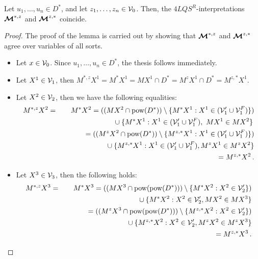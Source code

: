\documentclass{fundam}
\newcommand{\model}{\ensuremath{\mbox{\boldmath $\mathcal{M}$}}\xspace}
\newcommand{\pow}{\mbox{\rm pow}}
\newcommand{\QLQSR}{\ensuremath{\mbox{$4\mathit{LQS}^{R}$}}\xspace}
\begin{document}
\begin{lemma}
\label{le_M*zMz*} Let $u_{1},\ldots,u_{n} \in D^{*}$, and let
$z_{1},\ldots,z_{n} \in {\cal V}_{0}$. Then, the $\QLQSR$-interpretations $\model^{*,z}$
and $\model^{z,*}$ coincide.

\end{lemma}
\begin{proof}
The proof of the lemma is carried out by showing that $\model^{*,z}$ and $\model^{z,*}$ agree over variables of all sorts.
\begin{itemize}
\item Let $x \in {\cal V}_{0}$. Since $u_{1},\ldots,u_{n} \in D^{*}$, the thesis  follows immediately.

\item Let $X^1 \in {\cal V}_{1}$, then $M^{*,z}X^1 = M^{*}X^1 =
MX^1 \cap D^{*} = M^{z}X^1 \cap D^{*} = M^{z,*}X^1$.

\item Let $X^2 \in {\cal V}_{2}$, then we have the following equalities:
\begin{eqnarray*}
        M^{*,z}X^2 & = & M^{*}X^2 =
                        ((MX^2 \cap \pow(D^{*})) \setminus \{M^{*}X^1: X^1 \in ({\cal V}'_{1}\cup {\cal V}_{1}^{F})\})\\
                 &   &  \phantom{M^{*}X^2 =} \qquad \cup \{M^{*}X^1: X^1 \in ({\cal V}'_{1}\cup {\cal V}_{1}^{F}),~MX^1 \in MX^2\} \,  \\
                 &  & \phantom{M^{*}X^2} = ((M^{z}X^2 \cap \pow(D^*)) \setminus \{M^{z,*}X^1 : X^1 \in ({\cal V}_{1}'\cup {\cal V}_{1}^{F})\}) \\
                 &   &  \phantom{M^{*}X^2 =} \qquad \cup \{M^{z,*}X^1 : X^1 \in ({\cal V}_{1}'\cup {\cal V}_{1}^{F}), M^{z}X^1 \in M^{z}X^2\} \\
                 &  & \phantom{M^{*}X^2} =  M^{z,*}X^2 \,.
\end{eqnarray*}
\item Let $X^3 \in {\cal V}_{3}$, then the following holds:
\begin{eqnarray*}
        M^{*,z}X^3 & = & M^{*}X^3 =
                        ((MX^3 \cap \pow(\pow(D^*))) \setminus \{M^{*}X^2 : X^2 \in {\cal V}_{2}'\})\\
                 &   &  \phantom{M^{*}X^2 =} \qquad\cup \{M^{*}X^2 : X^2 \in {\cal V}_{2}', MX^2 \in MX^3\}  \\
                 &  & \phantom{M^{*}X^2} = ((M^{z}X^3 \cap \pow(\pow(D^*))) \setminus \{M^{z,*}X^2 : X^2 \in {\cal V}_{2}'\}) \\
                 &   &  \phantom{M^{*}X^2 =} \qquad\cup \{M^{z,*}X^2 : X^2 \in {\cal V}_{2}', M^{z}X^2 \in M^{z}X^3\} \\
                 &  & \phantom{M^{*}X^2} =  M^{z,*}X^3 \,.
\end{eqnarray*}
\end{itemize}
\end{proof}
\end{document}

